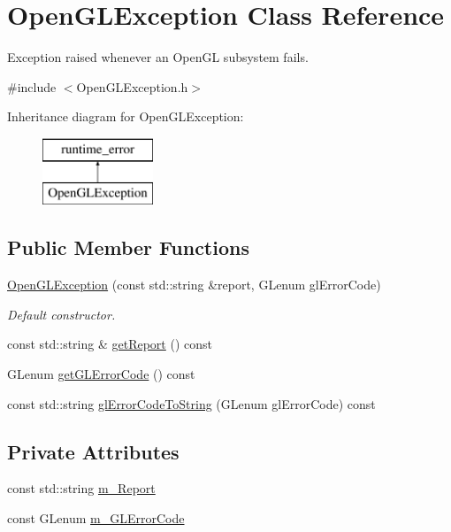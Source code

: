 \hypertarget{class_open_g_l_exception}{}\section{Open\+G\+L\+Exception Class Reference}
\label{class_open_g_l_exception}


Exception raised whenever an Open\+GL subsystem fails.  




{\ttfamily \#include $<$Open\+G\+L\+Exception.\+h$>$}

Inheritance diagram for Open\+G\+L\+Exception\+:\begin{figure}[H]
\begin{center}
\leavevmode
\includegraphics[height=2.000000cm]{class_open_g_l_exception}
\end{center}
\end{figure}
\subsection*{Public Member Functions}
\begin{DoxyCompactItemize}
\item 
\hyperlink{class_open_g_l_exception_ad11d7e03c2a4ca5b8a01f8c2f85a3c4a}{Open\+G\+L\+Exception} (const std\+::string \&report, G\+Lenum gl\+Error\+Code)
\begin{DoxyCompactList}\small\item\em Default constructor. \end{DoxyCompactList}\item 
const std\+::string \& \hyperlink{class_open_g_l_exception_a23e4708e8368cd7bbe93a43a604c523f}{get\+Report} () const 
\item 
G\+Lenum \hyperlink{class_open_g_l_exception_af56f3ea850dd3d2c5e295c6c5a9ed7cb}{get\+G\+L\+Error\+Code} () const 
\item 
const std\+::string \hyperlink{class_open_g_l_exception_aa2465505504557e4a2b30f78830df389}{gl\+Error\+Code\+To\+String} (G\+Lenum gl\+Error\+Code) const 
\end{DoxyCompactItemize}
\subsection*{Private Attributes}
\begin{DoxyCompactItemize}
\item 
const std\+::string \hyperlink{class_open_g_l_exception_a0f9575c625fdb797da165443277e1a54}{m\+\_\+\+Report}
\item 
const G\+Lenum \hyperlink{class_open_g_l_exception_ae92e43b987e00c0a6ea264fbbb1371cd}{m\+\_\+\+G\+L\+Error\+Code}
\end{DoxyCompactItemize}


